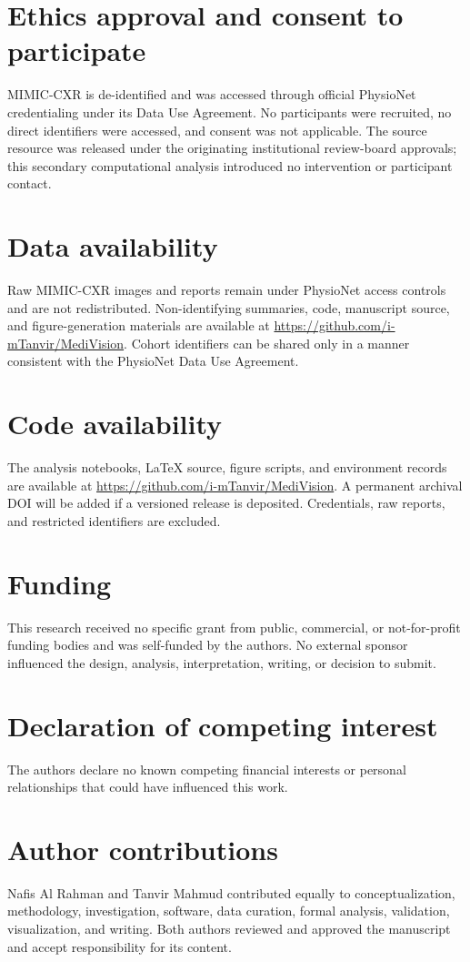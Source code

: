 \documentclass[a4paper,fleqn]{cas-sc}
\begin{document}
\section*{Ethics approval and consent to participate}
MIMIC-CXR is de-identified and was accessed through official PhysioNet
credentialing under its Data Use Agreement. No participants were recruited, no
direct identifiers were accessed, and consent was not applicable. The source
resource was released under the originating institutional review-board
approvals; this secondary computational analysis introduced no intervention or
participant contact.

\section*{Data availability}
Raw MIMIC-CXR images and reports remain under PhysioNet access controls and are
not redistributed. Non-identifying summaries, code, manuscript source, and
figure-generation materials are available at
\url{https://github.com/i-mTanvir/MediVision}. Cohort identifiers can be shared
only in a manner consistent with the PhysioNet Data Use Agreement.

\section*{Code availability}
The analysis notebooks, LaTeX source, figure scripts, and environment records
are available at \url{https://github.com/i-mTanvir/MediVision}. A permanent
archival DOI will be added if a versioned release is deposited. Credentials,
raw reports, and restricted identifiers are excluded.

\section*{Funding}
This research received no specific grant from public, commercial, or
not-for-profit funding bodies and was self-funded by the authors. No external
sponsor influenced the design, analysis, interpretation, writing, or decision
to submit.

\section*{Declaration of competing interest}
The authors declare no known competing financial interests or personal
relationships that could have influenced this work.

\section*{Author contributions}
Nafis Al Rahman and Tanvir Mahmud contributed equally to conceptualization,
methodology, investigation, software, data curation, formal analysis,
validation, visualization, and writing. Both authors reviewed and approved the
manuscript and accept responsibility for its content.
\end{document}
